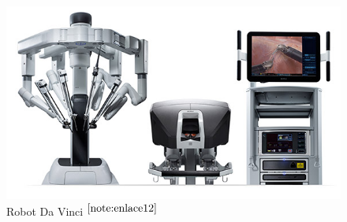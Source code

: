 \begin{figure}[ht!]
	\centering
	\begin{minipage}{0.5\linewidth}
		\centering
		\includegraphics[width=\linewidth]{figs/davincimed.png}
		\caption*{\centering Robot Da Vinci $^{\ref{note:enlace12}}$}
	\end{minipage}
    \hspace{1 cm}
	\begin{minipage}{0.15\linewidth}
		\centering

\end{minipage}
\end{figure}
